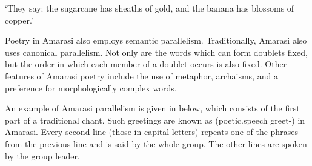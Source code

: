 \begin{exe}
\begin{xlist}
{		\glt	`They say: the sugarcane has sheaths of gold, and the banana has blossoms of copper.'\vspace{11pt}}
	\end{xlist}
\end{exe}

Poetry in Amarasi also employs semantic parallelism.
Traditionally, Amarasi also uses canonical parallelism.
Not only are the words which can form doublets fixed,
but the order in which each member of a doublet occurs is also fixed.
Other features of Amarasi poetry include the use of metaphor, archaisms,
and a preference for morphologically complex words.

An example of Amarasi parallelism is given in 
below, which consists of the first part of a traditional chant.
Such greetings are known as  (poetic.speech greet-{\at}) in Amarasi.
Every second line (those in capital letters) repeats one
of the phrases from the previous line and is said by the whole group.
The other lines are spoken by the group leader.

